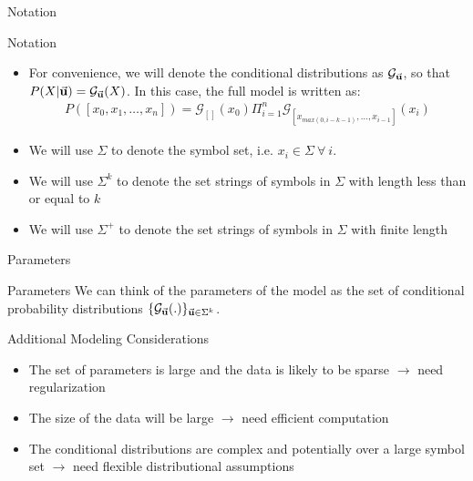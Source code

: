 \documentclass{beamer}
\newcommand{\G}{\mathcal{G}}
\newcommand{\bu}{{\bf u}}
\begin{document}
\begin{frame}[t]{Notation}
	\begin{block}{Notation}
		\begin{itemize}
			\item {For convenience, we will denote the conditional distributions as $\G_{\vec \bu}$, so that $P(X | \vec \bu) =  \G_{\vec \bu}(X)$.  In this case, the full model is written as:
						\begin{eqnarray*}
							P([x_0, x_1, \ldots, x_n]) = \G_{[]}(x_0) \Pi_{i = 1}^n \G_{[x_{max(0, i-k-1)}, \ldots, x_{i-1}]}(x_i)  
						\end{eqnarray*}
			}
		 	\item We will use $\Sigma$ to denote the symbol set, i.e. $x_i \in \Sigma \ \forall \ i$.
			\item We will use $\Sigma^k$ to denote the set strings of symbols in $\Sigma$ with length less than or equal to $k$
			\item We will use $\Sigma^+$ to denote the set strings of symbols in $\Sigma$ with finite length
		\end{itemize}
	\end{block}
	
\end{frame}

\begin{frame}[t]{Parameters}
	\begin{block}{Parameters}
		We can think of the parameters of the model as the set of conditional probability distributions $\{\G_{\vec \bu} (.)\}_{\vec \bu \in \Sigma^k}$. 
	\end{block}
	
	\begin{block}{Additional Modeling Considerations}
		\begin{itemize}
			\item The set of parameters is large and the data is likely to be sparse $\rightarrow$ need regularization
			\item The size of the data will be large $\rightarrow$ need efficient computation
			\item The conditional distributions are complex and potentially over a large symbol set $\rightarrow$ need flexible distributional assumptions
		\end{itemize}
	\end{block}
\end{frame}
\end{document}
